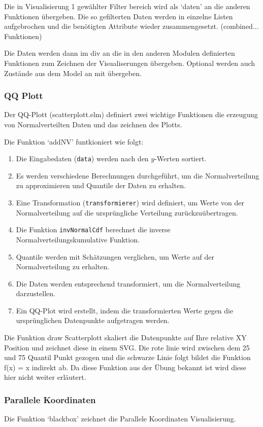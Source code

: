 \documentclass[usegeometry=true]{scrartcl}
\begin{document}
Die in Visualisierung 1 gewählter Filter bereich wird als `daten' an die anderen Funktionen übergeben.
Die so gefilterten Daten werden in einzelne Listen aufgebrochen und die benötigten Attribute wieder zusammengesetzt. 
(combined... Funktionen)


Die Daten werden dann im div an die in den anderen Modulen definierten Funktionen zum Zeichnen der Visualiserungen übergeben. 
Optional werden auch Zustände aus dem Model an mit übergeben.

\subsubsection{QQ Plott}
Der QQ-Plott (scatterplott.elm) definiert zwei wichtige Funktionen die erzeugung von Normalverteilten Daten und das zeichnen des Plotts.

Die Funktion `addNV' funtkioniert wie folgt:
\begin{enumerate}
  \item Die Eingabedaten (\texttt{data}) werden nach den $y$-Werten sortiert.
  \item Es werden verschiedene Berechnungen durchgeführt, um die Normalverteilung zu approximieren und Quantile der Daten zu erhalten.
  \item Eine Transformation (\texttt{transformierer}) wird definiert, um Werte von der Normalverteilung auf die ursprüngliche Verteilung zurückzuübertragen.
  \item Die Funktion \texttt{invNormalCdf} berechnet die inverse Normalverteilungskumulative Funktion.
  \item Quantile werden mit Schätzungen verglichen, um Werte auf der Normalverteilung zu erhalten.
  \item Die Daten werden entsprechend transformiert, um die Normalverteilung darzustellen.
  \item Ein QQ-Plot wird erstellt, indem die transformierten Werte gegen die ursprünglichen Datenpunkte aufgetragen werden.
\end{enumerate}

Die Funktion draw Scatterplott skaliert die Datenpunkte auf Ihre relative XY Position und zeichnet diese in einem SVG. 
Die rote linie wird zwischen dem 25 und 75 Quantil Punkt gezogen und die schwarze Linie folgt bildet die Funktion  f(x) = x indirekt ab.
Da diese Funktion aus der Übung bekannt ist wird diese hier nicht weiter erläutert.

\subsubsection{Parallele Koordinaten}
Die Funktion `blackbox' zeichnet die Parallele Koordinaten Visualisierung.
\end{document}

